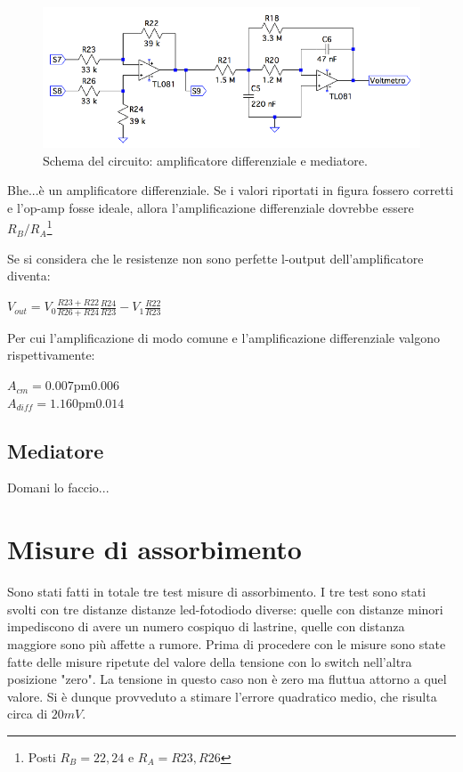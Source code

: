 \documentclass[a4paper,10pt]{article}
\begin{document}
\begin{figure}[H]
	\centering
	\includegraphics[width=\textwidth]{../grafici/DiffAmpAv.png}
	\caption{Schema del circuito: amplificatore differenziale e mediatore.}
	\label{fig:diffav}
\end{figure}

Bhe...è un amplificatore differenziale. Se i valori riportati in figura fossero corretti e l'op-amp fosse ideale, allora l'amplificazione differenziale dovrebbe essere $R_B/R_A$\footnote{Posti $R_B=22, 24$ e $R_A=R23, R26$}

Se si considera che le resistenze non sono perfette l-output dell'amplificatore diventa:

$V_{out}=V_0\frac{R23+R22}{R26+R24}\frac{R24}{R23}-V_1\frac{R22}{R23}$

Per cui l'amplificazione di modo comune e l'amplificazione differenziale valgono rispettivamente:

$A_{cm}=\unit{0.007\pm 0.006}{}$ \\
$A_{diff}=\unit{1.160 \pm 0.014}{}$ %

\subsection{Mediatore}

Domani lo faccio...



\section{Misure di assorbimento}


Sono stati fatti in totale tre test misure di assorbimento. I tre test sono stati svolti con tre distanze distanze led-fotodiodo diverse: quelle con distanze minori impediscono di avere un numero cospiquo di lastrine, quelle con distanza maggiore sono più affette a rumore. 
Prima di procedere con le misure sono state fatte delle misure ripetute del valore della tensione con lo switch nell'altra posizione "zero". La tensione in questo caso non è zero ma fluttua attorno a quel valore. Si è dunque provveduto a stimare l'errore quadratico medio, che risulta circa di $20 mV$.
\end{document}
